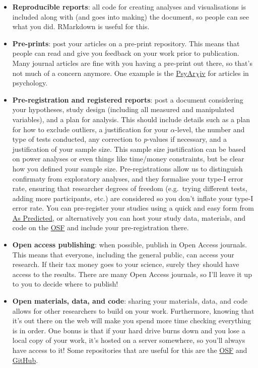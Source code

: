 \documentclass[
]{book}
\providecommand{\tightlist}{%
  \setlength{\itemsep}{0pt}\setlength{\parskip}{0pt}}
\begin{document}
\begin{itemize}
\tightlist
\item
  \textbf{Reproducible reports}: all code for creating analyses and visualisations is included along with (and goes into making) the document, so people can see what you did. RMarkdown is useful for this.
\item
  \textbf{Pre-prints}: post your articles on a pre-print repository. This means that people can read and give you feedback on your work prior to publication. Many journal articles are fine with you having a pre-print out there, so that's not much of a concern anymore. One example is the \href{https://psyarxiv.com/}{PsyAr\(\chi\)iv} for articles in psychology.
\item
  \textbf{Pre-registration and registered reports}: post a document considering your hypotheses, study design (including all measured and manipulated variables), and a plan for analysis. This should include details such as a plan for how to exclude outliers, a justification for your \(\alpha\)-level, the number and type of tests conducted, any correction to \emph{p}-values if necessary, and a justification of your sample size. This sample size justification can be based on power analyses or even things like time/money constraints, but be clear how you defined your sample size. Pre-registrations allow us to distinguish confirmaty from exploratory analyses, and they formalise your type-I error rate, ensuring that researcher degrees of freedom (e.g.~trying different tests, adding more participants, etc.) are considered so you don't inflate your type-I error rate. You can pre-register your studies using a quick and easy form from \href{https://aspredicted.org/}{As Predicted}, or alternatively you can host your study data, materials, and code on the \href{https://osf.io/}{OSF} and include your pre-registration there.
\item
  \textbf{Open access publishing}: when possible, publish in Open Access journals. This means that everyone, including the general public, can access your research. If their tax money goes to your science, surely they should have access to the results. There are many Open Access journals, so I'll leave it up to you to decide where to publish!
\item
  \textbf{Open materials, data, and code}: sharing your materials, data, and code allows for other researchers to build on your work. Furthermore, knowing that it's out there on the web will make you spend more time checking everything is in order. One bonus is that if your hard drive burns down and you lose a local copy of your work, it's hosted on a server somewhere, so you'll always have access to it! Some repositories that are useful for this are the \href{https://osf.io/}{OSF} and \href{https://github.com/}{GitHub}.
\end{itemize}
\end{document}
